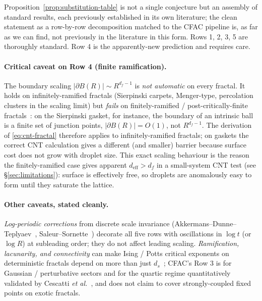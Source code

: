 \documentclass[11pt,a4paper]{article}
\theoremstyle{plain}
\begin{document}
Proposition~\ref{prop:substitution-table} is not a single
conjecture but an assembly of standard results, each previously
established in its own literature; the clean statement as a
row-by-row decomposition matched to the CFAC pipeline is, as far
as we can find, not previously in the literature in this form.
Rows 1, 2, 3, 5 are thoroughly standard.  Row 4 is the
apparently-new prediction and requires care.

\paragraph{Critical caveat on Row 4 (finite ramification).}
The boundary scaling $|\partial B(R)| \sim R^{d_f - 1}$ is
\emph{not automatic} on every fractal.  It holds on
infinitely-ramified fractals (Sierpinski carpets, Menger-type,
percolation clusters in the scaling limit) but \emph{fails} on
finitely-ramified / post-critically-finite
fractals~\citep{Kigami2001}: on the Sierpinski gasket, for
instance, the boundary of an intrinsic ball is a finite set of
junction points, $|\partial B(R)| = O(1)$, not
$R^{d_f - 1}$.  The derivation of
\eqref{eq:cnt-fractal} therefore applies to infinitely-ramified
fractals; on gaskets the correct CNT calculation gives a
different (and smaller) barrier because surface cost does not
grow with droplet size.  This exact scaling behaviour is the
reason the finitely-ramified case gives apparent $d_{\mathrm{eff}}
> d_f$ in a small-system CNT test (see
\S\ref{sec:limitations}): surface is effectively free, so droplets
are anomalously easy to form until they saturate the lattice.

\paragraph{Other caveats, stated cleanly.}
\emph{Log-periodic corrections} from discrete scale invariance
(Akkermans--Dunne--Teplyaev~\citep{AkkermansDunneTeplyaev2009},
Saleur--Sornette~\citep{SaleurSornette1996}) decorate all five
rows with oscillations in $\log t$ (or $\log R$) at subleading
order; they do not affect leading scaling.
\emph{Ramification, lacunarity, and connectivity} can make Ising /
Potts critical exponents on deterministic fractals depend on more
than just $d_s$~\citep{GefenAharonyMandelbrot1983,MonceauPerreau1998};
CFAC's Row 3 is for Gaussian / perturbative sectors and for the
quartic regime quantitatively validated by Cescatti
\textit{et al.}~\citep{Cescatti2024}, and does not claim to cover
strongly-coupled fixed points on exotic fractals.
\end{document}
